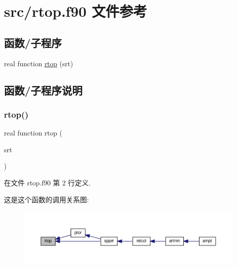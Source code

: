 \hypertarget{rtop_8f90}{}\section{src/rtop.f90 文件参考}
\label{rtop_8f90}
\subsection*{函数/子程序}
\begin{DoxyCompactItemize}
\item 
real function \mbox{\hyperlink{rtop_8f90_a2bfda028e2c5f8556981987339d95948}{rtop}} (srt)
\end{DoxyCompactItemize}


\subsection{函数/子程序说明}
\mbox{\label{rtop_8f90_a2bfda028e2c5f8556981987339d95948}} 
\subsubsection{\texorpdfstring{rtop()}{rtop()}}
{\footnotesize\ttfamily real function rtop (\begin{DoxyParamCaption}\item[{}]{srt }\end{DoxyParamCaption})}



在文件 rtop.\+f90 第 2 行定义.

这是这个函数的调用关系图\+:
\nopagebreak
\begin{figure}[H]
\begin{center}
\leavevmode
\includegraphics[width=350pt]{rtop_8f90_a2bfda028e2c5f8556981987339d95948_icgraph}
\end{center}
\end{figure}
